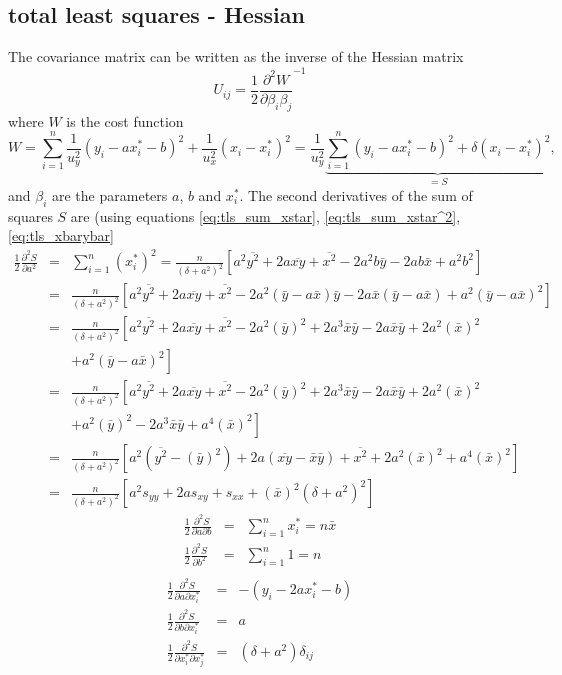 \documentclass[a4paper,11pt,onepage]{article}
\newcommand{\ddp}[2]{\frac{\partial #1}{\partial #2}}
\begin{document}
\subsection{total least squares - Hessian}
The covariance matrix can be written as the inverse of the Hessian matrix
\begin{equation}
 U_{ij} = \frac12 \ddp{^2W}{\beta_i \beta_j}^{-1}
\end{equation}
where $W$ is the cost function 
\begin{equation*}
 W= \sum_{i=1}^n \frac1{u_y^2} (y_i - a x_i^* - b)^2 + \frac1{u_x^2} (x_i - x_i^*)^2   = \frac1{u_y^2} \underbrace{\sum_{i=1}^n (y_i - a x_i^* - b)^2 + \delta (x_i - x_i^*)^2}_{=S},
\end{equation*} 
and $\beta_i$ are the parameters $a$, $b$ and $x_i^*$.
The second derivatives of the sum of squares $S$ are (using equations \eqref{eq:tls_sum_xstar}, \eqref{eq:tls_sum_xstar^2}, \eqref{eq:tls_xbarybar}
\begin{eqnarray*}
 \frac12 \ddp{^2S}{a^2} &=& \sum_{i=1}^n  (x_i^* )^2 =
 \frac{n}{(\delta+a^2)^2} \left[ a^2 \overline{ y^2}  + 2a \overline{xy} + \overline{x^2} 
-2 a^2b  \bar y  - 2 ab  \bar x + a^2 b^2  \right] \\
&=& \frac{n}{(\delta+a^2)^2} \left[ a^2 \overline{ y^2}  + 2a \overline{xy} + \overline{x^2}
- 2a^2 (\bar y - a \bar x)  \bar y - 2a  \bar x (\bar y- a \bar x ) + a^2  ( \bar y - a \bar x )^2 \right] \\
&=& \frac{n}{(\delta+a^2)^2} \left[ a^2 \overline{ y^2}  +  2a \overline{xy} + \overline{x^2}  \right. 
- 2a^2 (\bar y)^2  +  2a^3 \bar x \bar y
- 2a  \bar x \bar y+  2a^2  (\bar x )^2
\\
&& \left.
+ a^2  ( \bar y - a \bar x )^2 \right] \\
&=& \frac{n}{(\delta+a^2)^2} \left[ a^2 \overline{ y^2}  + 2a \overline{xy} + \overline{x^2}  \right. 
- 2a^2 (\bar y)^2  +  2a^3 \bar x \bar y
- 2a  \bar x \bar y+  2a^2  (\bar x )^2 \\
&& \left. +a^2  (\bar y)^2 - 2a^3 \bar x \bar y + a^4  (\bar x)^2 \right]\\
&=& \frac{n}{(\delta+a^2)^2} \left[ 
a^2 (\overline{ y^2} - (\bar y)^2)  + 2a ( \overline{xy} -  \bar x \bar y) + \overline{x^2} + 2 a^2  (\bar x)^2 + a^4  (\bar x)^2
\right]\\
&=& \frac{n}{(\delta+a^2)^2} \left[ a^2 s_{yy}  + 2a  s_{xy} + s_{xx} + (\bar x)^2 (\delta+a^2)^2\right]
\end{eqnarray*}
\begin{eqnarray*}
 \frac12 \ddp{^2S}{a \partial b} &=& \sum_{i=1}^n  x_i^* = n \bar x  \\
 \frac12 \ddp{^2 S} {b^2} &=& \sum_{i=1}^n 1 = n  \\
  \end{eqnarray*}
\begin{eqnarray*}
 \frac12 \ddp{^2S}{a \partial x_i^*} &=& -(y_i - 2a x_i^* -b) \\
 \frac12 \ddp{^2S}{b \partial x_i^*} &=&  a \\
 \frac12 \ddp{^2S}{x_i^* \partial x_j^*} &=& (\delta+a^2) \delta_{ij}           
 \end{eqnarray*}
\end{document}
